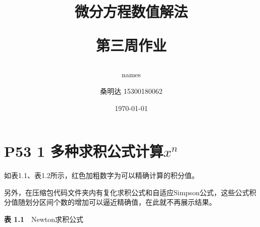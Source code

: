 \documentclass{article}%
\author{names}
\title{\heiti 微分方程数值解法\\ [2ex] \begin{large} 第三周作业 \end{large}}
\author{\kaishu 桑明达 15300180062}
\date{\today}
\begin{document}
\maketitle


\section{P53 1 多种求积公式计算$x^n$}

如表1.1、表1.2所示，红色加粗数字为可以精确计算的积分值。

另外，在压缩包代码文件夹内有复化求积公式和自适应Simpson公式，这些公式积分值随划分区间个数的增加可以逼近精确值，在此就不再展示结果。

\begin{center}
	\textbf{表 1.1}~~Newton求积公式\\
\end{center}
\end{document}
